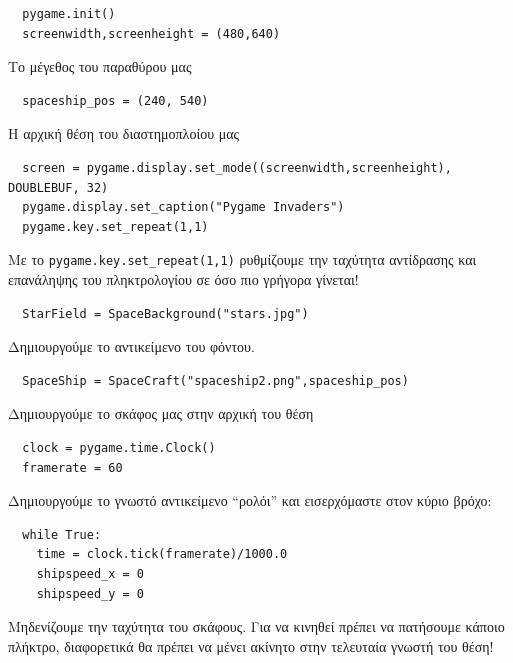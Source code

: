 \begin{verbatim}
  pygame.init()
  screenwidth,screenheight = (480,640)
\end{verbatim}

Το μέγεθος του παραθύρου μας

\begin{verbatim}
  spaceship_pos = (240, 540)
\end{verbatim}

Η αρχική θέση του διαστημοπλοίου μας

\begin{verbatim}
  screen = pygame.display.set_mode((screenwidth,screenheight), DOUBLEBUF, 32)
  pygame.display.set_caption("Pygame Invaders")
  pygame.key.set_repeat(1,1)
\end{verbatim}

Με το {\tt pygame.key.set\_repeat(1,1)} ρυθμίζουμε την ταχύτητα αντίδρασης και επανάληψης του πληκτρολογίου σε όσο πιο γρήγορα γίνεται!

\begin{verbatim}
  StarField = SpaceBackground("stars.jpg")
\end{verbatim}

Δημιουργούμε το αντικείμενο του φόντου.

\begin{verbatim}
  SpaceShip = SpaceCraft("spaceship2.png",spaceship_pos)
\end{verbatim}

Δημιουργούμε το σκάφος μας στην αρχική του θέση

\begin{verbatim}
  clock = pygame.time.Clock()
  framerate = 60
\end{verbatim}

Δημιουργούμε το γνωστό αντικείμενο ``ρολόι'' και εισερχόμαστε στον κύριο βρόχο:

\begin{verbatim}
  while True:
    time = clock.tick(framerate)/1000.0
    shipspeed_x = 0
    shipspeed_y = 0
\end{verbatim}

Μηδενίζουμε την ταχύτητα του σκάφους. Για να κινηθεί πρέπει να πατήσουμε κάποιο πλήκτρο, διαφορετικά θα πρέπει να μένει ακίνητο στην τελευταία γνωστή του θέση!

